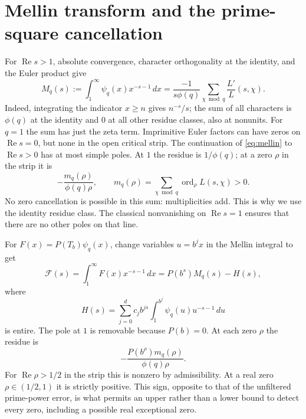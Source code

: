 \documentclass[11pt]{article}
\theoremstyle{definition}\newtheorem{definition}[theorem]{Definition}
\newcommand{\Rea}{\operatorname{Re}}
\newcommand{\ord}{\operatorname{ord}}
\newcommand{\psq}{\psi_q}
\begin{document}
\section{Mellin transform and the prime-square cancellation}
For $\Rea s>1$, absolute convergence, character orthogonality at the identity, and the Euler product give
\begin{equation}\label{eq:mellin}
 M_q(s):=\int_1^\infty\psq(x)x^{-s-1}\,dx
 =\frac{-1}{s\phi(q)}\sum_{\chi\bmod q}\frac{L'}{L}(s,\chi).
\end{equation}
Indeed, integrating the indicator $x\ge n$ gives $n^{-s}/s$; the sum of all characters is $\phi(q)$ at the identity and $0$ at all other residue classes, also at nonunits. For $q=1$ the sum has just the zeta term. Imprimitive Euler factors can have zeros on $\Rea s=0$, but none in the open critical strip. The continuation of \eqref{eq:mellin} to $\Rea s>0$ has at most simple poles. At $1$ the residue is $1/\phi(q)$; at a zero $\rho$ in the strip it is
\begin{equation}\label{eq:residue0}
 -\frac{m_q(\rho)}{\phi(q)\rho},\qquad
 m_q(\rho)=\sum_{\chi\bmod q}\ord_\rho L(s,\chi)>0.
\end{equation}
No zero cancellation is possible in this sum: multiplicities add. This is why we use the identity residue class. The classical nonvanishing on $\Rea s=1$ ensures that there are no other poles on that line.

For $F(x)=P(T_b)\psq(x)$, change variables $u=b^jx$ in the Mellin integral to get
\begin{equation}\label{eq:filtered}
 \mathcal F(s)=\int_1^\infty F(x)x^{-s-1}\,dx
 =P(b^s)M_q(s)-H(s),
\end{equation}
where
\[
 H(s)=\sum_{j=0}^d c_j b^{js}\int_1^{b^j}\psq(u)u^{-s-1}\,du
\]
is entire. The pole at $1$ is removable because $P(b)=0$. At each zero $\rho$ the residue is
\begin{equation}\label{eq:r}
 -\frac{P(b^\rho)m_q(\rho)}{\phi(q)\rho}.
\end{equation}
For $\Rea\rho>1/2$ in the strip this is nonzero by admissibility. At a real zero $\rho\in(1/2,1)$ it is strictly positive. This sign, opposite to that of the unfiltered prime-power error, is what permits an upper rather than a lower bound to detect every zero, including a possible real exceptional zero.
\end{document}

